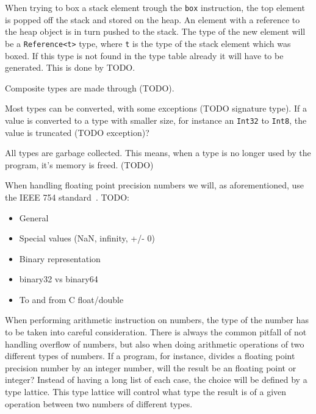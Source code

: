 When trying to box a stack element trough the {\tt box} instruction, the top
element is popped off the stack and stored on the heap. An element with a
reference to the heap object is in turn pushed to the stack. The type of the new
element will be a {\tt Reference<t>} type, where {\tt t} is the type of the
stack element which was boxed. If this type is not found in the type table
already it will have to be generated. This is done by TODO.

Composite types are made through (TODO).

Most types can be converted, with some exceptions (TODO signature type). If a
value is converted to a type with smaller size, for instance an {\tt Int32} to
{\tt Int8}, the value is truncated (TODO exception)?

All types are garbage collected. This means, when a type is no longer used by
the program, it's memory is freed. (TODO)


When handling floating point precision numbers we will, as aforementioned, use
the IEEE 754 standard~\cite{ieee754}.
TODO:
\begin{itemize}
  \item General
  \item Special values (NaN, infinity, +/- 0)
  \item Binary representation
  \item binary32 vs binary64
  \item To and from C float/double
\end{itemize}


When performing arithmetic instruction on numbers, the type of the number has to
be taken into careful consideration. There is always the common pitfall of not
handling overflow of numbers, but also when doing arithmetic operations of two
different types of numbers. If a program, for instance, divides a floating point
precision number by an integer number, will the result be an floating point or
integer? Instead of having a long list of each case, the choice will be defined
by a type lattice. This type lattice will control what type the result is of a
given operation between two numbers of different types.

